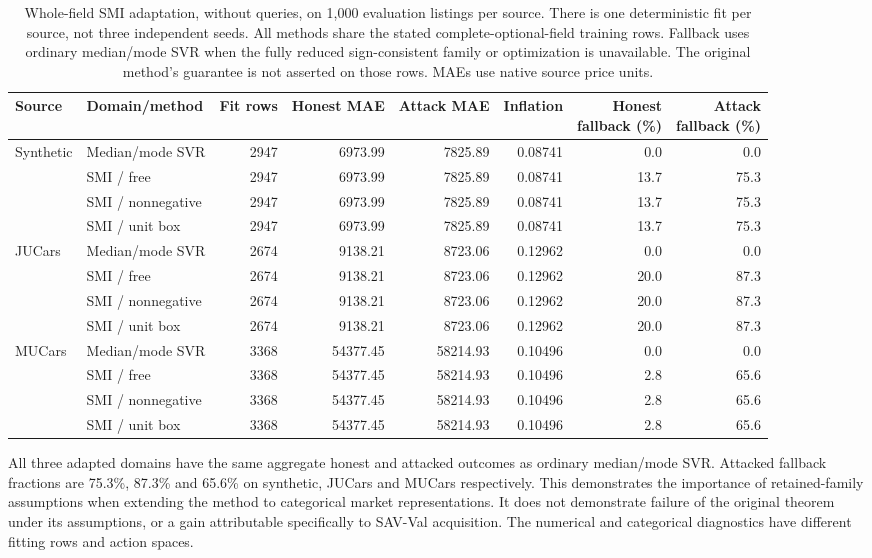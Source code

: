 \begin{table}[t]
\centering\small\setlength{\tabcolsep}{3pt}
\caption{Whole-field SMI adaptation, without queries, on 1,000 evaluation
listings per source. There is one deterministic fit per source, not three
independent seeds. All methods share the stated complete-optional-field
training rows. Fallback uses ordinary median/mode SVR when the fully reduced
sign-consistent family or optimization is unavailable. The original method's
guarantee is not asserted on those rows. MAEs use native source price units.}
\label{tab:grouped_smi}
\begin{tabular}{llrrrrrr}
\toprule
Source & Domain/method & Fit rows & Honest MAE & Attack MAE & Inflation & \shortstack{Honest\\fallback (\%)} & \shortstack{Attack\\fallback (\%)}\\
\midrule
Synthetic & Median/mode SVR & 2947 & 6973.99 & 7825.89 & 0.08741 & 0.0 & 0.0\\
 & SMI / free & 2947 & 6973.99 & 7825.89 & 0.08741 & 13.7 & 75.3\\
 & SMI / nonnegative & 2947 & 6973.99 & 7825.89 & 0.08741 & 13.7 & 75.3\\
 & SMI / unit box & 2947 & 6973.99 & 7825.89 & 0.08741 & 13.7 & 75.3\\
\midrule
JUCars & Median/mode SVR & 2674 & 9138.21 & 8723.06 & 0.12962 & 0.0 & 0.0\\
 & SMI / free & 2674 & 9138.21 & 8723.06 & 0.12962 & 20.0 & 87.3\\
 & SMI / nonnegative & 2674 & 9138.21 & 8723.06 & 0.12962 & 20.0 & 87.3\\
 & SMI / unit box & 2674 & 9138.21 & 8723.06 & 0.12962 & 20.0 & 87.3\\
\midrule
MUCars & Median/mode SVR & 3368 & 54377.45 & 58214.93 & 0.10496 & 0.0 & 0.0\\
 & SMI / free & 3368 & 54377.45 & 58214.93 & 0.10496 & 2.8 & 65.6\\
 & SMI / nonnegative & 3368 & 54377.45 & 58214.93 & 0.10496 & 2.8 & 65.6\\
 & SMI / unit box & 3368 & 54377.45 & 58214.93 & 0.10496 & 2.8 & 65.6\\
\bottomrule
\end{tabular}
\end{table}

All three adapted domains have the same aggregate honest and attacked
outcomes as ordinary median/mode SVR. Attacked fallback fractions are
75.3\%, 87.3\% and 65.6\% on synthetic, JUCars and MUCars respectively.
This demonstrates the importance of retained-family assumptions when
extending the method to categorical market representations. It does not
demonstrate failure of the original theorem under its assumptions, or a
gain attributable specifically to SAV-Val acquisition. The numerical and
categorical diagnostics have different fitting rows and action spaces.

